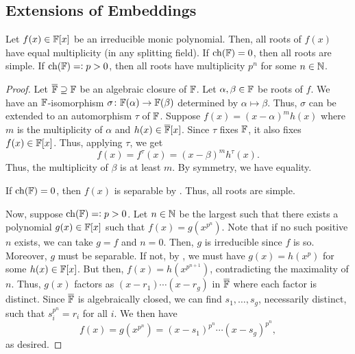 \subsection{Extensions of Embeddings}

\begin{prop} \label{multiplicity-is-power-of-p}
    Let $f(x) \in \mathbb{F}[x]$ be an irreducible monic polynomial. Then, all roots of $f(x)$ have equal multiplicity (in any splitting field). If $\operatorname{ch}(\mathbb{F}) = 0$, then all roots are simple. If $\operatorname{ch}(\mathbb{F}) =\vcentcolon p > 0$, then all roots have multiplicity $p^n$ for some $n \in \mathbb{N}$.
\end{prop}
\begin{proof}
    Let $\overline{\mathbb{F}} \supseteq \mathbb{F}$ be an algebraic closure of $\mathbb{F}$. Let $\alpha, \beta \in \mathbb{F}$ be roots of $f$. We have an $\mathbb{F}$-isomorphism $\sigma \colon \mathbb{F}(\alpha) \to \mathbb{F}(\beta)$ determined by $\alpha \mapsto \beta$. Thus, $\sigma$ can be extended to an automorphism $\tau$ of $\mathbb{F}$. Suppose $f(x) = (x-\alpha)^mh(x)$ where $m$ is the multiplicity of $\alpha$ and $h(x) \in \overline{\mathbb{F}}[x]$. Since $\tau$ fixes $\mathbb{F}$, it also fixes $f(x) \in \mathbb{F}[x]$. Thus, applying $\tau$, we get
    \[
        f(x) = f^{\tau}(x) = (x-\beta)^m h^{\tau}(x).
    \]
    Thus, the multiplicity of $\beta$ is at least $m$. By symmetry, we have equality. 
    
    If $\operatorname{ch}(\mathbb{F}) = 0$, then $f(x)$ is separable by . Thus, all roots are simple.
    
    Now, suppose $\operatorname{ch}(\mathbb{F}) = \vcentcolon p > 0$. Let $n \in \mathbb{N}$ be the largest such that there exists a polynomial $g(x) \in \mathbb{F}[x]$ such that $f(x) = g(x^{p^n})$. Note that if no such positive $n$ exists, we can take $g = f$ and $n = 0$. Then, $g$ is irreducible since $f$ is so. Moreover, $g$ must be separable. If not, by , we must have $g(x) = h(x^p)$ for some $h(x) \in \mathbb{F}[x]$. But then, $f(x) = h(x^{p^{n+1}})$, contradicting the maximality of $n$. Thus, $g(x)$ factors as $(x-r_1)\cdots(x-r_g)$ in $\overline{\mathbb{F}}$ where each factor is distinct. Since $\overline{\mathbb{F}}$ is algebraically closed, we can find $s_1, \ldots, s_g$, necessarily distinct, such that $s_i^{p^n} = r_i$ for all $i$. We then have
    \[
        f(x) = g(x^{p^n}) = (x-s_1)^{p^n} \cdots (x-s_g)^{p^n},
    \]
    as desired.
\end{proof}

